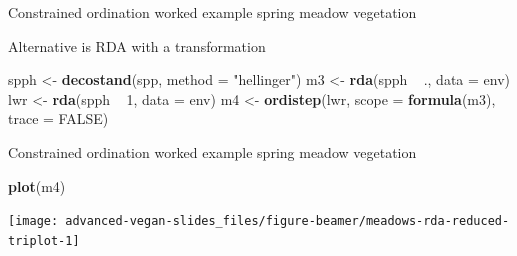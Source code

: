\documentclass[10pt,ignorenonframetext,compress, aspectratio=169]{beamer}
\newenvironment{Shaded}{\begin{snugshade}}{\end{snugshade}}
\newcommand{\KeywordTok}[1]{\textcolor[rgb]{0.13,0.29,0.53}{\textbf{{#1}}}}
\newcommand{\DataTypeTok}[1]{\textcolor[rgb]{0.13,0.29,0.53}{{#1}}}
\newcommand{\DecValTok}[1]{\textcolor[rgb]{0.00,0.00,0.81}{{#1}}}
\newcommand{\StringTok}[1]{\textcolor[rgb]{0.31,0.60,0.02}{{#1}}}
\newcommand{\OtherTok}[1]{\textcolor[rgb]{0.56,0.35,0.01}{{#1}}}
\newcommand{\NormalTok}[1]{{#1}}
\begin{document}
\begin{frame}[fragile]{Constrained ordination worked example \textbar{}
spring meadow vegetation}

Alternative is RDA with a transformation

\scriptsize

\begin{Shaded}
\begin{Highlighting}[]
\NormalTok{spph <-}\StringTok{ }\KeywordTok{decostand}\NormalTok{(spp, }\DataTypeTok{method =} \StringTok{"hellinger"}\NormalTok{)}
\NormalTok{m3 <-}\StringTok{ }\KeywordTok{rda}\NormalTok{(spph ~}\StringTok{ }\NormalTok{., }\DataTypeTok{data =} \NormalTok{env)}
\NormalTok{lwr <-}\StringTok{ }\KeywordTok{rda}\NormalTok{(spph ~}\StringTok{ }\DecValTok{1}\NormalTok{, }\DataTypeTok{data =} \NormalTok{env)}
\NormalTok{m4 <-}\StringTok{ }\KeywordTok{ordistep}\NormalTok{(lwr, }\DataTypeTok{scope =} \KeywordTok{formula}\NormalTok{(m3), }\DataTypeTok{trace =} \OtherTok{FALSE}\NormalTok{)}
\end{Highlighting}
\end{Shaded}

\normalsize

\end{frame}

\begin{frame}[fragile]{Constrained ordination worked example \textbar{}
spring meadow vegetation}

\scriptsize

\begin{Shaded}
\begin{Highlighting}[]
\KeywordTok{plot}\NormalTok{(m4)}
\end{Highlighting}
\end{Shaded}

\begin{center}\texttt{[image: advanced-vegan-slides\_files/figure-beamer/meadows-rda-reduced-triplot-1]} \end{center}

\normalsize

\end{frame}
\end{document}
